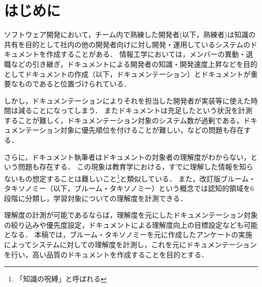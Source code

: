 \section{はじめに}
ソフトウェア開発において，チーム内で熟練した開発者(以下，熟練者)は知識の共有を目的として社内の他の開発者向けに対し開発・運用しているシステムのドキュメントを作成することがある．
情報工学においては，メンバーの異動・退職などの引き継ぎ，ドキュメントによる開発者の知識・開発速度上昇などを目的としてドキュメントの作成（以下，ドキュメンテーション）とドキュメントが重要なものであると位置づけられている\cite{bib:ozawa}．

しかし，ドキュメンテーションによりそれを担当した開発者が実装等に使えた時間は減ることになってしまう．
またドキュメントは充足したという状況を計測することが難しく，ドキュメンテーション対象のシステム数が過剰である，ドキュメンテーション対象に優先順位を付けることが難しい，などの問題も存在する．

さらに，ドキュメント執筆者はドキュメントの対象者の理解度がわからない，という問題も存在する．
この現象は教育学における，すでに理解した情報を知らないもの想定することは難しいこと\footnote{「知識の呪縛」と呼ばれる}\cite{bib:kaneda}と類似している．
また，改訂版ブルーム・タキソノミー（以下，ブルーム・タキソノミー）という概念では認知的領域を6段階に分類し，学習対象についての理解度を計測できる．

理解度の計測が可能であるならば，理解度を元にしたドキュメンテーション対象の絞り込みや優先度設定，ドキュメントによる理解度向上の目標設定なども可能となる．
本稿では，ブルーム・タキソノミーを元に作成したアンケートの実施によってシステムに対しての理解度を計測し，これを元にドキュメンテーションを行い，高い品質のドキュメントを作成することを目的とする．
